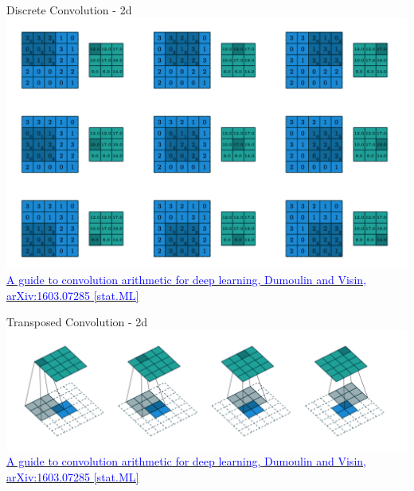 \documentclass[]{beamer}
\begin{document}
\begin{frame}{Discrete Convolution - 2d}
\centering
\includegraphics[scale=0.325]{figures/discrete-convolution} \\
\href{https://arxiv.org/abs/1511.07122}
{\textcolor{blue}{A guide to convolution arithmetic for deep learning, Dumoulin and Visin, arXiv:1603.07285 [stat.ML]}}
\end{frame}


\begin{frame}{Transposed Convolution - 2d}
\centering
\includegraphics[scale=0.325]{figures/transposed-convolution} \\
\href{https://arxiv.org/abs/1511.07122}
{\textcolor{blue}{A guide to convolution arithmetic for deep learning, Dumoulin and Visin, arXiv:1603.07285 [stat.ML]}}
\end{frame}
\end{document}
